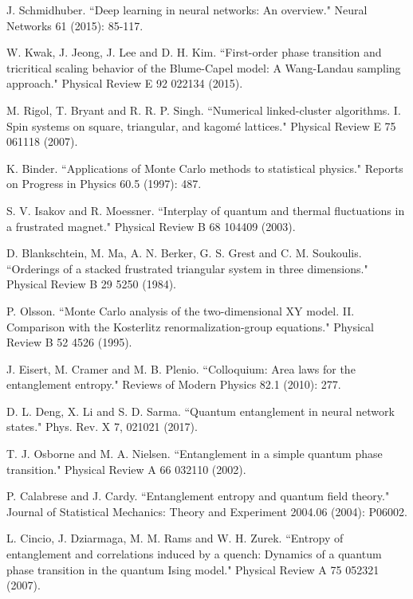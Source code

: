 \documentclass[pra,letterpaper,10pt,twocolumn]{revtex4}
\begin{document}
\begin{thebibliography}{100}
J. Schmidhuber. ``Deep learning in neural networks: An overview." Neural Networks 61 (2015): 85-117.

W. Kwak, J. Jeong, J. Lee and D. H. Kim. ``First-order phase transition and tricritical scaling behavior of the Blume-Capel model: A Wang-Landau sampling approach." Physical Review E 92 022134 (2015).

M. Rigol, T. Bryant and R. R. P. Singh. ``Numerical linked-cluster algorithms. I. Spin systems on square, triangular, and kagom{\'e} lattices." Physical Review E 75 061118 (2007).

K. Binder. ``Applications of Monte Carlo methods to statistical physics." Reports on Progress in Physics 60.5 (1997): 487.

S. V. Isakov and R. Moessner. ``Interplay of quantum and thermal fluctuations in a frustrated magnet." Physical Review B 68 104409 (2003).

D. Blankschtein, M. Ma, A. N. Berker, G. S. Grest and C. M. Soukoulis. ``Orderings of a stacked frustrated triangular system in three dimensions." Physical Review B 29 5250 (1984).

P. Olsson. ``Monte Carlo analysis of the two-dimensional XY model. II. Comparison with the Kosterlitz renormalization-group equations." Physical Review B 52 4526 (1995).

J. Eisert, M. Cramer and M. B. Plenio. ``Colloquium: Area laws for the entanglement entropy." Reviews of Modern Physics 82.1 (2010): 277.

D. L. Deng, X. Li and S. D. Sarma. ``Quantum entanglement in neural network states." Phys. Rev. X 7, 021021 (2017).

T. J. Osborne and M. A. Nielsen. ``Entanglement in a simple quantum phase transition." Physical Review A 66 032110 (2002).

P. Calabrese and J. Cardy. ``Entanglement entropy and quantum field theory." Journal of Statistical Mechanics: Theory and Experiment 2004.06 (2004): P06002.

L. Cincio, J. Dziarmaga, M. M. Rams and W. H. Zurek. ``Entropy of entanglement and correlations induced by a quench: Dynamics of a quantum phase transition in the quantum Ising model." Physical Review A 75 052321 (2007).


\end{thebibliography}
\end{document}
